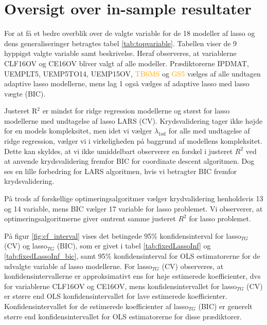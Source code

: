 \section{Oversigt over in-sample resultater} 
For at få et bedre overblik over de valgte variable for de 18 modeller af lasso og dens generaliseringer betragtes tabel \ref{tab:topvariable}.
Tabellen viser de 9 hyppigst valgte variable samt beskrivelse. 
Heraf observeres, at variablerne \textcolor{blue3}{CLF16OV} og \textcolor{blue3}{CE16OV} bliver valgt af alle modeller.
Prædiktorerne \textcolor{chartreuse4}{IPDMAT}, \textcolor{blue3}{UEMPLT5}, \textcolor{blue3}{UEMP5TO14}, \textcolor{blue3}{UEMP15OV}, \textcolor{orange}{TB6MS} og \textcolor{orange}{GS5} vælges af alle undtagen adaptive lasso modellerne, mens \textcolor{blue3}{lag 1} også vælges af adaptive lasso med lasso vægte (BIC).



Justeret R$^2$ er mindst for ridge regression modellerne og størst for lasso modellerne med undtagelse af lasso LARS (CV).
Krydsvalidering tager ikke højde for en models kompleksitet, men idet vi vælger \(\lambda_\text{1sd}\) for alle med undtagelse af ridge regression, vælger vi i virkeligheden på baggrund af modellens kompleksitet.
Dette kan skyldes, at vi ikke umiddelbart observerer en forskel i justeret \(R^2\) ved at anvende krydsvalidering fremfor BIC for coordinate descent algoritmen.
Dog ses en lille forbedring for LARS algoritmen, hvis vi betragter BIC fremfor krydsvalidering.

På trods af forskellige optimeringsalgoritmer vælger krydvalidering henholdsvis 13 og 14 variable, mens BIC vælger 17 variable for lasso problemet.
Vi observerer, at optimeringsalgoritmerne giver omtrent samme justeret \(R^2\) for lasso problemet.


På figur \ref{fig:cf_interval} vises det betingede 95\% konfidensinterval for lasso\(_{TG}\) (CV) og lasso\(_{TG}\) (BIC), som er givet i tabel \ref{tab:fixedLassoInf} og \ref{tab:fixedLassoInf_bic}, samt 95\% konfidensinterval for OLS estimatorerne for de udvalgte variable af lasso modellerne. 
For lasso\(_{TG}\) (CV) observeres, at konfidensintervallerne er approksimativt ens for høje estimerede koefficienter, dvs for variablerne \textcolor{blue3}{CLF16OV} og \textcolor{blue3}{CE16OV}, mens  konfidensintervallet for lasso\(_{TG}\) (CV) er større end OLS konfidensintervallet for lave estimerede koefficienter.
Konfidensintervallet for de estimerede koefficienter af lasso\(_{TG}\) (BIC) er generelt større end konfidensintervallet for OLS estimatorerne for disse prædiktorer.

